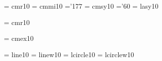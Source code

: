  \font\twtyrm  = cmr10     %
 \font\twtymi  = cmmi10    %
    \skewchar\twtymi ='177          %
 \font\twtysy  = cmsy10    %
    \skewchar\twtysy ='60           %
 \font\twtyly  = lasy10   %
 
 \font\twfvrm  = cmr10     %
 
 \font\tenex   = cmex10
 
\font\tenln    = line10
\font\tenlnw   = linew10
\font\tencirc  = lcircle10    %
\font\tencircw = lcirclew10   %
 
